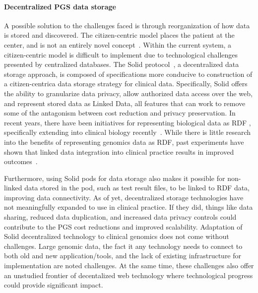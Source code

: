\documentclass[a4paper,11pt]{article}
\begin{document}
\begin{refsection}
\paragraph{Decentralized PGS data storage}
A possible solution to the challenges faced is through reorganization of how data is stored and discovered. 
The citizen-centric model places the patient at the center, and is not an entirely novel concept~\cite{brands_patient-centered_2022}.
Within the current system, a citizen-centric model is difficult to implement due to technological challenges presented by centralized databases.
The Solid protocol~\cite{solid}, a decentralized data storage approach, is composed of specifications more conducive to construction of a citizen-centrica data storage strategy for clinical data.
Specifically, Solid offers the ability to granularize data privacy, allow authorized data access over the web, and represent stored data as Linked Data, all features that can work to remove some of the antagonism between cost reduction and privacy preservation.
In recent years, there have been initiatives for representing biological data as RDF \cite{sib_rdf_2024}, specifically extending into clinical biology recently~\cite{sphn_rdf_2023}. 
While there is little research into the benefits of representing genomics data as RDF, past experiments have shown that linked data integration into clinical practice results in improved outcomes~\cite{farinelli_linked_2015}.


Furthermore, using Solid pods for data storage also makes it possible for non-linked data stored in the pod, such as test result files, to be linked to RDF data, improving data connectivity.
As of yet, decentralized storage technologies have not meaningfully expanded to use in clinical practice.
If they did, things like data sharing, reduced data duplication, and increased data privacy controls could contribute to the PGS cost reductions and improved scalability.
Adaptation of Solid decentralized technology to clinical genomics does not come without challenges.
Large genomic data, the fact it any technology needs to connect to both old and new application/tools, and the lack of existing infrastructure for implementation are noted challenges. %
At the same time, these challenges also offer an unstudied frontier of decentalized web technology where technological progress could provide significant impact. %


\end{refsection}
\end{document}
